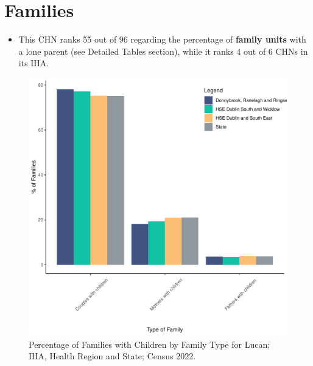 \documentclass{article}
\begin{document}
\section{Families}\label{sect:Fam}
\begin{itemize}
\item This CHN ranks  55 out of 96 regarding the percentage of \textbf{family units} with a lone parent (see Detailed Tables section), while it ranks   4 out of 6 CHNs in its IHA.
\end{itemize}
\begin{figure}[H]
	\centering
	\includegraphics[width = 150mm]{../figures/FamED.pdf}
	\caption{Percentage of Families with Children by Family Type for Lucan; IHA, Health Region and State; Census 2022.}
	\label{fig:vbnv}
	\end{figure}
	
\end{document}
